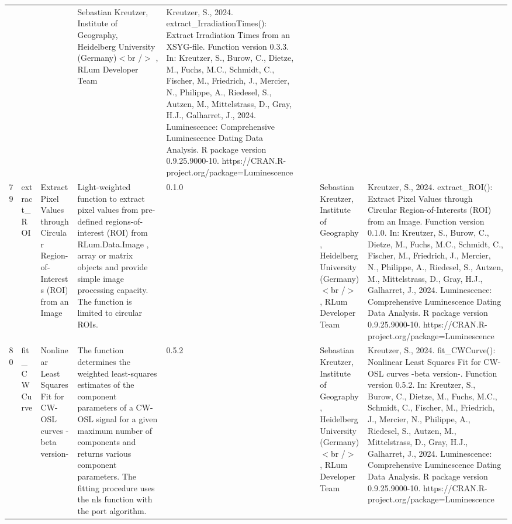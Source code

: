 \begin{table}[ht]
\begin{tabular}{rllllllll}
 &  &  & Sebastian Kreutzer, Institute of Geography, Heidelberg University (Germany)$<$br /$>$ , RLum Developer Team & Kreutzer, S., 2024. extract\_IrradiationTimes(): Extract Irradiation Times from an XSYG-file. Function version 0.3.3. In: Kreutzer, S., Burow, C., Dietze, M., Fuchs, M.C., Schmidt, C., Fischer, M., Friedrich, J., Mercier, N., Philippe, A., Riedesel, S., Autzen, M., Mittelstrass, D., Gray, H.J., Galharret, J., 2024. Luminescence: Comprehensive Luminescence Dating Data Analysis. R package version 0.9.25.9000-10. https://CRAN.R-project.org/package=Luminescence
 \\ 
  79 & extract\_ROI & Extract Pixel Values through Circular Region-of-Interests (ROI) from an Image & Light-weighted function to extract pixel values from pre-defined regions-of-interest (ROI) from RLum.Data.Image ,  array  or  matrix  objects and provide simple image processing capacity. The function is limited to circular ROIs. & 0.1.0
 &  &  & Sebastian Kreutzer, Institute of Geography, Heidelberg University (Germany)$<$br /$>$ , RLum Developer Team & Kreutzer, S., 2024. extract\_ROI(): Extract Pixel Values through Circular Region-of-Interests (ROI) from an Image. Function version 0.1.0. In: Kreutzer, S., Burow, C., Dietze, M., Fuchs, M.C., Schmidt, C., Fischer, M., Friedrich, J., Mercier, N., Philippe, A., Riedesel, S., Autzen, M., Mittelstrass, D., Gray, H.J., Galharret, J., 2024. Luminescence: Comprehensive Luminescence Dating Data Analysis. R package version 0.9.25.9000-10. https://CRAN.R-project.org/package=Luminescence
 \\ 
  80 & fit\_CWCurve & Nonlinear Least Squares Fit for CW-OSL curves -beta version- & The function determines the weighted least-squares estimates of the component parameters of a CW-OSL signal for a given maximum number of components and returns various component parameters. The fitting procedure uses the  nls  function with the  port  algorithm. & 0.5.2
 &  &  & Sebastian Kreutzer, Institute of Geography, Heidelberg University (Germany)$<$br /$>$ , RLum Developer Team & Kreutzer, S., 2024. fit\_CWCurve(): Nonlinear Least Squares Fit for CW-OSL curves -beta version-. Function version 0.5.2. In: Kreutzer, S., Burow, C., Dietze, M., Fuchs, M.C., Schmidt, C., Fischer, M., Friedrich, J., Mercier, N., Philippe, A., Riedesel, S., Autzen, M., Mittelstrass, D., Gray, H.J., Galharret, J., 2024. Luminescence: Comprehensive Luminescence Dating Data Analysis. R package version 0.9.25.9000-10. https://CRAN.R-project.org/package=Luminescence
 \\ 

\end{tabular}
\end{table}
